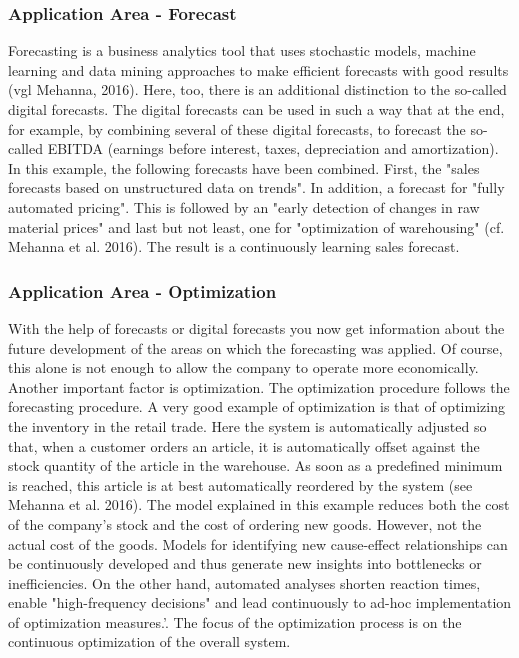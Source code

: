 \documentclass[12pt,twocolumn,twoside]{conference}   %
\begin{document}
\subsubsection{Application Area - Forecast}
Forecasting is a business analytics tool that uses stochastic models, machine learning and data mining approaches to make efficient forecasts with good results (vgl Mehanna, 2016). Here, too, there is an additional distinction to the so-called digital forecasts. The digital forecasts can be used in such a way that at the end, for example, by combining several of these digital forecasts, to forecast the so-called EBITDA (earnings before interest, taxes, depreciation and amortization). In this example, the following forecasts have been combined. First, the "sales forecasts based on unstructured data on trends". In addition, a forecast for "fully automated pricing". This is followed by an "early detection of changes in raw material prices" and last but not least, one for "optimization of warehousing" (cf. Mehanna et al. 2016). The result is a continuously learning sales forecast. 

\subsubsection{Application Area - Optimization}
With the help of forecasts or digital forecasts you now get information about the future development of the areas on which the forecasting was applied. Of course, this alone is not enough to allow the company to operate more economically. Another important factor is optimization. The optimization procedure follows the forecasting procedure. A very good example of optimization is that of optimizing the inventory in the retail trade. Here the system is automatically adjusted so that, when a customer orders an article, it is automatically offset against the stock quantity of the article in the warehouse. As soon as a predefined minimum is reached, this article is at best automatically reordered by the system (see Mehanna et al. 2016). The model explained in this example reduces both the cost of the company's stock and the cost of ordering new goods. However, not the actual cost of the goods. Models for identifying new cause-effect relationships can be continuously developed and thus generate new insights into bottlenecks or inefficiencies. On the other hand, automated analyses shorten reaction times, enable "high-frequency decisions" and lead continuously to ad-hoc implementation of optimization measures.'\cite{PAPER2}. The focus of the optimization process is on the continuous optimization of the overall system.
\end{document}
